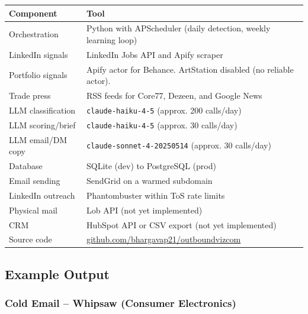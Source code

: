 \documentclass[11pt, letterpaper]{article}
\begin{document}
\begin{table}[H]
\centering
\begin{tabularx}{\linewidth}{@{} l X @{}}
  \toprule
  \textbf{Component} & \textbf{Tool} \\
  \midrule
  Orchestration       & Python with APScheduler (daily detection, weekly learning loop) \\
  LinkedIn signals    & LinkedIn Jobs API and Apify scraper \\
  Portfolio signals   & Apify actor for Behance. ArtStation disabled (no reliable actor). \\
  Trade press         & RSS feeds for Core77, Dezeen, and Google News \\
  LLM classification  & \texttt{claude-haiku-4-5} (approx. 200 calls/day) \\
  LLM scoring/brief   & \texttt{claude-haiku-4-5} (approx. 30 calls/day) \\
  LLM email/DM copy   & \texttt{claude-sonnet-4-20250514} (approx. 30 calls/day) \\
  Database            & SQLite (dev) to PostgreSQL (prod) \\
  Email sending       & SendGrid on a warmed subdomain \\
  LinkedIn outreach   & Phantombuster within ToS rate limits \\
  Physical mail       & Lob API (not yet implemented) \\
  CRM                 & HubSpot API or CSV export (not yet implemented) \\
  Source code         & \href{https://github.com/bhargavap21/outboundvizcom}{github.com/bhargavap21/outboundvizcom} \\
  \bottomrule
\end{tabularx}
\end{table}

\subsection{Example Output}

\subsubsection{Cold Email -- Whipsaw (Consumer Electronics)}
\end{document}
